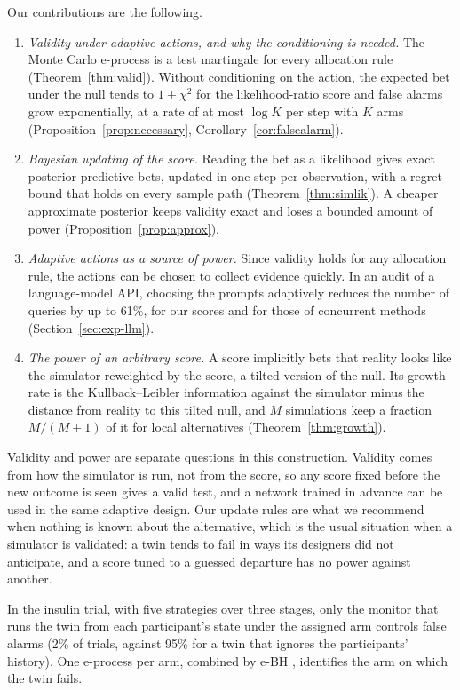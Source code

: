 Our contributions are the following.
\begin{enumerate}
\item \emph{Validity under adaptive actions, and why the conditioning is
needed.} The Monte Carlo e-process is a test martingale for every allocation
rule (Theorem~\ref{thm:valid}). Without conditioning on the action, the
expected bet under the null tends to $1+\chi^2$ for the likelihood-ratio score
and false alarms grow exponentially, at a rate of at most $\log K$ per step
with $K$ arms (Proposition~\ref{prop:necessary},
Corollary~\ref{cor:falsealarm}).
\item \emph{Bayesian updating of the score.} Reading the bet as a likelihood
gives exact posterior-predictive bets, updated in one step per observation,
with a regret bound that holds on every sample path
(Theorem~\ref{thm:simlik}). A cheaper approximate posterior keeps validity
exact and loses a bounded amount of power (Proposition~\ref{prop:approx}).
\item \emph{Adaptive actions as a source of power.} Since validity holds for
any allocation rule, the actions can be chosen to collect evidence quickly. In
an audit of a language-model API, choosing the prompts adaptively reduces the
number of queries by up to 61\%, for our scores and for those of concurrent
methods (Section~\ref{sec:exp-llm}).
\item \emph{The power of an arbitrary score.} A score implicitly bets that
reality looks like the simulator reweighted by the score, a tilted version of
the null. Its growth rate is the Kullback--Leibler information against the
simulator minus the distance from reality to this tilted null, and $M$
simulations keep a fraction $M/(M+1)$ of it for local alternatives
(Theorem~\ref{thm:growth}).
\end{enumerate}

Validity and power are separate questions in this construction. Validity
comes from how the simulator is run, not from the score, so any score fixed
before the new outcome is seen gives a valid test, and a network trained in
advance can be used in the same adaptive design. Our update rules are what we recommend when
nothing is known about the alternative, which is the usual situation when a
simulator is validated: a twin tends to fail in ways its designers did not
anticipate, and a score tuned to a guessed departure has no power against
another.

In the insulin trial, with five strategies over three stages, only the monitor
that runs the twin from each participant's state under the assigned arm
controls false alarms (2\% of trials, against 95\% for a twin that ignores the
participants' history). One e-process per arm, combined by e-BH
\citep{xu2021unified}, identifies the arm on which the twin fails.

